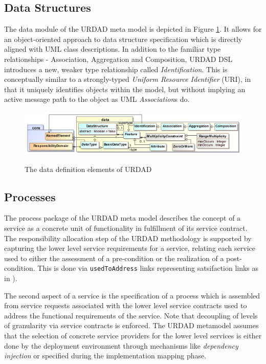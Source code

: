 \subsection{Data Structures}

The data module of the URDAD meta model is depicted in Figure \ref{fig:dataStructureModule}. It allows for an object-oriented approach to data structure specification which is directly aligned with UML class descriptions. In addition to the familiar type relationships - Association, Aggregation and Composition, URDAD DSL introduces a new, weaker type relationship called \emph{Identification}. This is conceptually similar to a strongly-typed \emph{Uniform Resource Identifier} (URI), in that it uniquely identifies objects within the model, but without implying an active message path to the object as UML \emph{Association}s do.
 
\begin{figure}[thbp]
  \centering
  \includegraphics[width=\pagewidth]{data}\\   
  \caption{The data definition elements of URDAD}
  \label{fig:dataStructureModule}
\end{figure}

\subsection{Processes}

The process package of the URDAD meta model describes the concept of a service as a concrete unit of functionality in fulfillment of its service contract. The responsibility allocation step of the URDAD methodology is supported by capturing the lower level service requirements for a service, relating each service used to either the assessment of a pre-condition or the realization of a post-condition. This is done via \verb+usedToAddress+ links representing satsifaction links as in  \cite{ramesh_toward_2001}). 

The second aspect of a service is the specification of a process which is assembled from service requests associated with the lower level service contracts used to address the functional requirements of the service. Note that decoupling of levels of granularity via service contracts is enforced. The URDAD metamodel assumes that the selection of concrete service providers for the lower level services is either done by the deployment environment through mechanisms like \emph{dependency injection} or specified during the implementation mapping phase.

